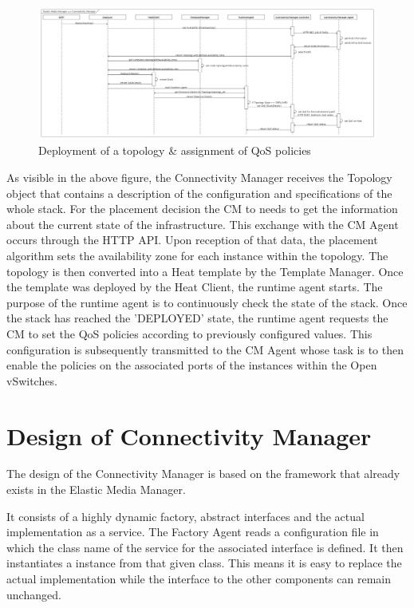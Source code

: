 \begin{figure}[H]
\centering

\includegraphics[width=\textwidth]{images/design/sequence_diagram}

\caption{Deployment of a topology \& assignment of QoS policies}
\end{figure}
\newpage
As visible in the above figure, the Connectivity Manager receives the Topology object that contains a description of the configuration and specifications of the whole stack. For the placement decision the CM to needs to get the information about the current state of the infrastructure. This exchange with the CM Agent occurs through the HTTP API. Upon reception of that data, the placement algorithm sets the availability zone for each instance within the topology. The topology is then converted into a Heat template by the Template Manager. Once the template  was deployed by the Heat Client, the runtime agent starts. The purpose of the runtime agent is to continuously check the state of the stack. Once the stack has reached the 'DEPLOYED' state, the runtime agent requests the CM to set the QoS policies according to previously configured values. This configuration is subsequently transmitted to the CM Agent whose task is to then enable the policies on the associated ports of the instances within the Open vSwitches.


\section{Design of Connectivity Manager}

The design of the Connectivity Manager is based on the framework that already exists in the Elastic Media Manager.

It consists of a highly dynamic factory, abstract interfaces and the actual implementation as a service.
The Factory Agent reads a configuration file in which the class name of the service for the associated interface is defined. It then instantiates a instance from that given class. This means it is easy to replace the actual implementation while the interface to the other components can remain unchanged.

